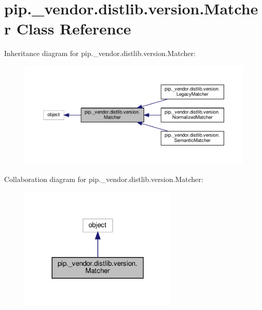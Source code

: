 \hypertarget{classpip_1_1__vendor_1_1distlib_1_1version_1_1Matcher}{}\section{pip.\+\_\+vendor.\+distlib.\+version.\+Matcher Class Reference}
\label{classpip_1_1__vendor_1_1distlib_1_1version_1_1Matcher}


Inheritance diagram for pip.\+\_\+vendor.\+distlib.\+version.\+Matcher\+:
\nopagebreak
\begin{figure}[H]
\begin{center}
\leavevmode
\includegraphics[width=350pt]{classpip_1_1__vendor_1_1distlib_1_1version_1_1Matcher__inherit__graph}
\end{center}
\end{figure}


Collaboration diagram for pip.\+\_\+vendor.\+distlib.\+version.\+Matcher\+:
\nopagebreak
\begin{figure}[H]
\begin{center}
\leavevmode
\includegraphics[width=213pt]{classpip_1_1__vendor_1_1distlib_1_1version_1_1Matcher__coll__graph}
\end{center}
\end{figure}

